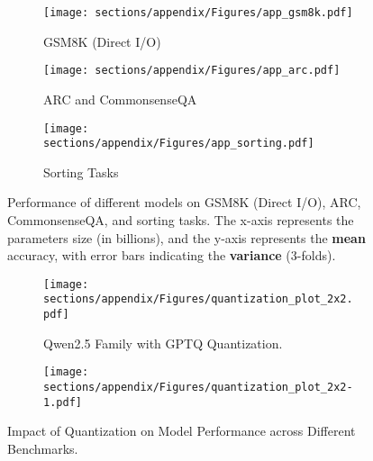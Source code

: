 \begin{figure*}
    \centering
    \begin{subfigure}[b]{1\linewidth}
        \centering
        \texttt{[image: sections/appendix/Figures/app\_gsm8k.pdf]}
        \caption{GSM8K (Direct I/O)}
    \end{subfigure}
    
    \vspace{0.5cm} %
    
    \begin{subfigure}[b]{1\linewidth}
        \centering
        \texttt{[image: sections/appendix/Figures/app\_arc.pdf]}
        \caption{ARC and CommonsenseQA}
    \end{subfigure}
    
    \vspace{0.5cm} %
    
    \begin{subfigure}[b]{1\linewidth}
        \centering
        \texttt{[image: sections/appendix/Figures/app\_sorting.pdf]}
        \caption{Sorting Tasks}
    \end{subfigure}
    
    \caption{Performance of different models on GSM8K (Direct I/O), ARC, CommonsenseQA, and sorting tasks. The x-axis represents the parameters size (in billions), and the y-axis represents the \textbf{mean} accuracy, with error bars indicating the \textbf{variance} (3-folds).}
    \label{fig:app1}
\end{figure*}



\begin{figure*}
    \centering
    \begin{subfigure}[b]{1\linewidth}
        \texttt{[image: sections/appendix/Figures/quantization\_plot\_2x2.pdf]}
        \caption{Qwen2.5 Family with GPTQ Quantization.}
    \end{subfigure}
    
    \vspace{1cm} %

    \begin{subfigure}[b]{1\linewidth}
        \texttt{[image: sections/appendix/Figures/quantization\_plot\_2x2-1.pdf]}
    \end{subfigure}
    
    \caption{Impact of Quantization on Model Performance across Different Benchmarks.}
    \label{fig:app2}
\end{figure*}



